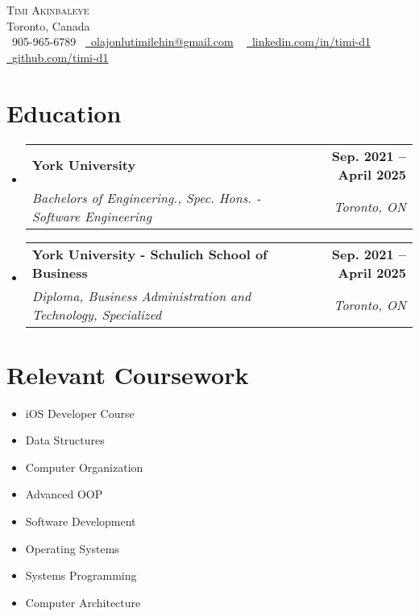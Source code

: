 \documentclass[letterpaper,11pt]{article}
\makeatletter
\newcommand{\resumeSubheading}[4]{
  \vspace{-2pt}\item
    \begin{tabular*}{1.0\textwidth}[t]{l@{\extracolsep{\fill}}r}
      \textbf{#1} & \textbf{\small #2} \\
      \textit{\small#3} & \textit{\small #4} \\
    \end{tabular*}\vspace{-7pt}
}
\newcommand{\resumeSubHeadingListStart}{\begin{itemize}[leftmargin=0.0in, label={}]}
\newcommand{\resumeSubHeadingListEnd}{\end{itemize}}
\makeatother
\begin{document}

\begin{center}
    {\Huge \scshape Timi Akinbaleye} \\ \vspace{1pt}
    Toronto, Canada \\ \vspace{1pt}
    \small \raisebox{-0.1\height}\faPhone\ 905-965-6789~ \href{mailto:olajonlutimilehin@gmail.com}{\raisebox{-0.2\height}\faEnvelope\  \underline{olajonlutimilehin@gmail.com}} ~ 
    \href{https://www.linkedin.com/in/timi-d1/}{\raisebox{-0.2\height}\faLinkedin\ \underline{linkedin.com/in/timi-d1}}  ~
    \href{https://github.com/timi-d1}{\raisebox{-0.2\height}\faGithub\ \underline{github.com/timi-d1}}
    \vspace{-8pt}
\end{center}


\section{Education}
  \resumeSubHeadingListStart
    \resumeSubheading
      {York University}{Sep. 2021 -- April 2025}
      {Bachelors of Engineering., Spec. Hons. - Software Engineering}
      {Toronto, ON}
  \resumeSubHeadingListEnd
  
    \resumeSubHeadingListStart
    \resumeSubheading
      {York University - Schulich School of Business}{Sep. 2021 -- April 2025}
      {Diploma, Business Administration and Technology, Specialized}
      {Toronto, ON}
  \resumeSubHeadingListEnd
  
\section{Relevant Coursework}
        \begin{multicols}{4}
            \begin{itemize}[itemsep=-5pt, parsep=3pt]
                \item\small iOS Developer Course
                \item Data Structures
                \item Computer Organization
                \item Advanced OOP
                \item Software Development
                \item Operating Systems
                \item Systems Programming
                \item Computer Architecture
            \end{itemize}
        \end{multicols}
        \vspace*{2.0\multicolsep}
\end{document}
